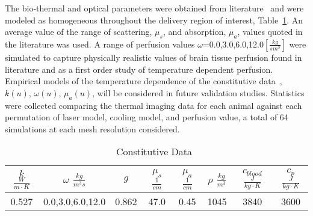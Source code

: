 \documentclass{article}
\begin{document}
The bio-thermal and optical parameters were obtained from
literature~\cite{Handbook05,Welch95,duck1990} and were modeled as
homogeneous throughout the delivery region of interest,
Table~\ref{modeldata}.  An average value of the range of
scattering, $\mu_s$, and absorption, $\mu_a$, values quoted in the
literature was used.  A range of perfusion values
$\omega$=0.0,3.0,6.0,12.0$[\frac{kg}{s m^3}]$ were simulated to
capture physically realistic values of brain tissue perfusion found
in literature and as a first order study of temperature dependent
perfusion.  Empirical models of the temperature dependence of the
constitutive data~\cite{pegau1997absorption,Duggan00,Handbook05},
$k(u)$, $\omega(u)$, $\mu_a(u)$, will be considered in future
validation studies.  Statistics were collected comparing the
thermal imaging data for each animal against each permutation of
laser model, cooling model, and perfusion value, a total of 64
simulations at each mesh resolution considered. 

\begin{table}[h]
\caption{Constitutive Data~\cite{Handbook05,Welch95,duck1990}}\label{modeldata}
\centering 
\begin{tabular}{|c|c|c|c|c|c|c|c|} \hline 
$k $ $ \frac{W}{ m \cdot K}$ & $\omega$ $\frac{kg}{m^3 s}$ &  $g$  &  $\mu_s$ $\frac{1}{cm}$  &  $\mu_a$  $\frac{1}{cm}$   &  $\rho$ $\frac{kg}{m^3}$ &   $c_{blood}$ $ \frac{J}{kg \cdot K}$ &  $c_p$ $\frac{J}{kg \cdot K}$ \\ \hline
          0.527              &     0.0,3.0,6.0,12.0        & 0.862 &        47.0              &       0.45                 &  1045                        &            3840                      &                  3600          \\ \hline
\end{tabular}
\end{table}


\end{document}
